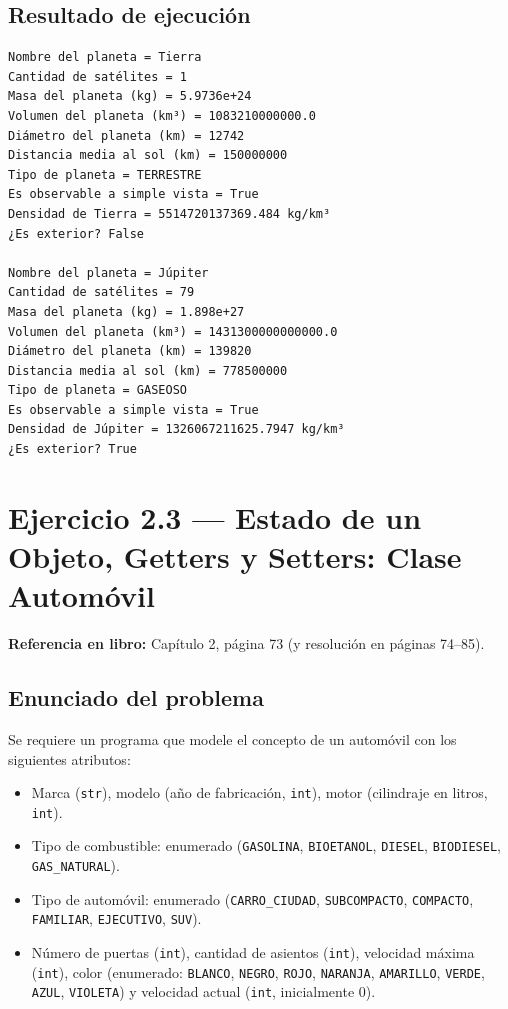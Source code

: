 \documentclass[11pt,a4paper]{article}
\begin{document}
\subsection{Resultado de ejecución}
\begin{verbatim}
Nombre del planeta = Tierra
Cantidad de satélites = 1
Masa del planeta (kg) = 5.9736e+24
Volumen del planeta (km³) = 1083210000000.0
Diámetro del planeta (km) = 12742
Distancia media al sol (km) = 150000000
Tipo de planeta = TERRESTRE
Es observable a simple vista = True
Densidad de Tierra = 5514720137369.484 kg/km³
¿Es exterior? False

Nombre del planeta = Júpiter
Cantidad de satélites = 79
Masa del planeta (kg) = 1.898e+27
Volumen del planeta (km³) = 1431300000000000.0
Diámetro del planeta (km) = 139820
Distancia media al sol (km) = 778500000
Tipo de planeta = GASEOSO
Es observable a simple vista = True
Densidad de Júpiter = 1326067211625.7947 kg/km³
¿Es exterior? True
\end{verbatim}

\newpage

\section{Ejercicio 2.3 — Estado de un Objeto, Getters y Setters: Clase Automóvil}
\textbf{Referencia en libro:} Capítulo 2, página 73 (y resolución en páginas 74--85).

\subsection{Enunciado del problema}
Se requiere un programa que modele el concepto de un automóvil con los siguientes atributos:
\begin{itemize}
    \item Marca (\texttt{str}), modelo (año de fabricación, \texttt{int}), motor (cilindraje en litros, \texttt{int}).
    \item Tipo de combustible: enumerado (\texttt{GASOLINA}, \texttt{BIOETANOL}, \texttt{DIESEL}, \texttt{BIODIESEL}, \texttt{GAS\_NATURAL}).
    \item Tipo de automóvil: enumerado (\texttt{CARRO\_CIUDAD}, \texttt{SUBCOMPACTO}, \texttt{COMPACTO}, \texttt{FAMILIAR}, \texttt{EJECUTIVO}, \texttt{SUV}).
    \item Número de puertas (\texttt{int}), cantidad de asientos (\texttt{int}), velocidad máxima (\texttt{int}), color (enumerado: \texttt{BLANCO}, \texttt{NEGRO}, \texttt{ROJO}, \texttt{NARANJA}, \texttt{AMARILLO}, \texttt{VERDE}, \texttt{AZUL}, \texttt{VIOLETA}) y velocidad actual (\texttt{int}, inicialmente $0$).
\end{itemize}
\end{document}
